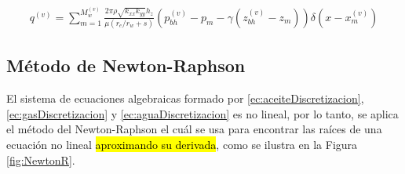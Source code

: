 \begin{align}
	q^{(v)} = \sum_{m=1}^{M^{(v)}_{w}}\frac{2\pi\rho\sqrt{k_{xx}k_{yy}}h_{z}}{\mu\left(r_{e}/r_{w} +s\right)}\left(p_{bh}^{(v)}-p_{m}-\gamma\left(z_{bh}^{(v)}-z_{m}\right)\right)\delta\left(x-x_{m}^{(v)}\right)
\end{align}
%
\subsection{Método de Newton-Raphson}
%
El sistema de ecuaciones algebraicas formado por \ref{ec:aceiteDiscretizacion}, \ref{ec:gasDiscretizacion} y \ref{ec:aguaDiscretizacion} es no lineal, por lo tanto, se aplica el método del Newton-Raphson el cuál se usa para encontrar las raíces de una ecuación no lineal \hl{aproximando su derivada}, como se ilustra en la Figura \ref{fig:NewtonR}.\\

